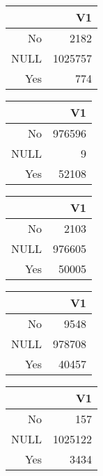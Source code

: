 \bigskip\bigskip
\centering
\begin{tabular}{rr}
  \hline
 & V1 \\ 
  \hline
No & 2182 \\ 
  NULL & 1025757 \\ 
  Yes & 774 \\ 
   \hline
\end{tabular}

\bigskip\bigskip
\centering
\begin{tabular}{rr}
  \hline
 & V1 \\ 
  \hline
No & 976596 \\ 
  NULL &   9 \\ 
  Yes & 52108 \\ 
   \hline
\end{tabular}

\bigskip\bigskip
\centering
\begin{tabular}{rr}
  \hline
 & V1 \\ 
  \hline
No & 2103 \\ 
  NULL & 976605 \\ 
  Yes & 50005 \\ 
   \hline
\end{tabular}

\bigskip\bigskip
\centering
\begin{tabular}{rr}
  \hline
 & V1 \\ 
  \hline
No & 9548 \\ 
  NULL & 978708 \\ 
  Yes & 40457 \\ 
   \hline
\end{tabular}

\bigskip\bigskip
\centering
\begin{tabular}{rr}
  \hline
 & V1 \\ 
  \hline
No & 157 \\ 
  NULL & 1025122 \\ 
  Yes & 3434 \\ 
   \hline
\end{tabular}

